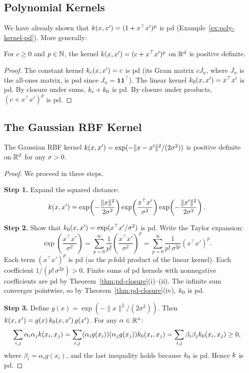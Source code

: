 \documentclass[11pt,a4paper]{article}
\begin{document}
\subsection{Polynomial Kernels}

We have already shown that $k(x, x') = (1 + x^\top x')^p$ is
pd (Example~\ref{ex:poly-kernel-pd}). More generally:

\begin{proposition}
\label{prop:general-poly}
For $c \ge 0$ and $p \in \mathbb{N}$, the kernel $k(x, x') =
(c + x^\top x')^p$ on $\mathbb{R}^d$ is positive definite.
\end{proposition}

\begin{proof}
The constant kernel $k_c(x, x') = c$ is pd (its Gram matrix
$cJ_n$, where $J_n$ is the all-ones matrix, is psd since $J_n =
\mathbf{1}\mathbf{1}^\top$). The linear kernel $k_0(x, x')
= x^\top x'$ is pd. By closure under sums, $k_c + k_0$
is pd. By closure under products, $(c + x^\top x')^p$ is pd.
\end{proof}

\subsection{The Gaussian RBF Kernel}

\begin{theorem}
\label{thm:gaussian-pd}
The Gaussian RBF kernel $k(x, x') = \exp(-\|x - x'\|^2 /
(2\sigma^2))$ is positive definite on $\mathbb{R}^d$ for any $\sigma > 0$.
\end{theorem}

\begin{proof}
We proceed in three steps.

\textbf{Step 1.} Expand the squared distance:
\[
k(x, x') = \exp\!\left(-\frac{\|x\|^2}{2\sigma^2}\right)
\exp\!\left(\frac{x^\top x'}{\sigma^2}\right)
\exp\!\left(-\frac{\|x'\|^2}{2\sigma^2}\right).
\]

\textbf{Step 2.} Show that $k_0(x, x') = \exp(x^\top x' /
\sigma^2)$ is pd. Write the Taylor expansion:
\[
\exp\!\left(\frac{x^\top x'}{\sigma^2}\right)
= \sum_{p=0}^\infty \frac{1}{p!} \left(\frac{x^\top x'}{\sigma^2}
\right)^p
= \sum_{p=0}^\infty \frac{1}{p! \, \sigma^{2p}} (x^\top x')^p.
\]
Each term $(x^\top x')^p$ is pd (as the $p$-fold product of the
linear kernel). Each coefficient $1/(p! \, \sigma^{2p}) > 0$. Finite
sums of pd kernels with nonneg\-ative coefficients are pd by
Theorem~\ref{thm:pd-closure}(i)--(ii). The infinite sum converges
pointwise, so by Theorem~\ref{thm:pd-closure}(iv), $k_0$ is pd.

\textbf{Step 3.} Define $g(x) = \exp(-\|x\|^2 / (2\sigma^2))$.
Then $k(x, x') = g(x) \, k_0(x, x') \, g(x')$. For any
$\alpha \in \mathbb{R}^n$:
\[
\sum_{i,j} \alpha_i \alpha_j k(x_i, x_j)
= \sum_{i,j} (\alpha_i g(x_i))(\alpha_j g(x_j)) k_0(x_i, x_j)
= \sum_{i,j} \beta_i \beta_j k_0(x_i, x_j) \ge 0,
\]
where $\beta_i = \alpha_i g(x_i)$, and the last inequality holds
because $k_0$ is pd. Hence $k$ is pd.
\end{proof}
\end{document}
